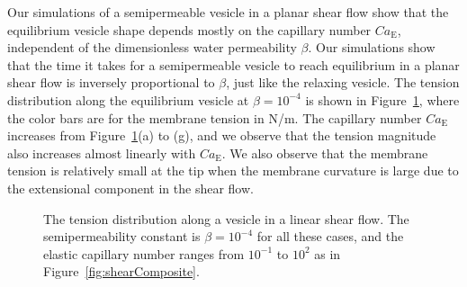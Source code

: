 \documentclass[prb,preprint,showpacs,preprintnumbers,amsmath,amssymb,longbibliography]{revtex4-1}
\begin{document}
Our simulations of a semipermeable vesicle in a planar shear flow show
that the equilibrium vesicle shape depends mostly on the capillary
number $Ca_\mathrm{E}$, independent of the dimensionless water
permeability $\beta$. Our simulations show that the time it takes for a
semipermeable vesicle to reach equilibrium in a planar shear flow is
inversely proportional to $\beta$, just like the relaxing vesicle. The
tension distribution along the equilibrium vesicle at $\beta=10^{-4}$ is
shown in Figure~\ref{fig:shearTensions}, where the color bars are for
the membrane tension in N/m. The capillary number $Ca_\mathrm{E}$
increases from Figure~\ref{fig:shearTensions}(a) to (g), and we observe
that the tension magnitude also increases almost linearly with
$Ca_\mathrm{E}$. We also observe that the membrane tension is relatively
small at the tip when the membrane curvature is large due to the
extensional component in the shear flow.
\begin{figure}[hbp]
  \caption{\label{fig:shearTensions} The tension distribution along a
  vesicle in a linear shear flow. The semipermeability constant is
  $\beta = 10^{-4}$ for all these cases, and the elastic capillary
  number ranges from $10^{-1}$ to $10^{2}$ as in
  Figure~\ref{fig:shearComposite}.}
\end{figure}

\end{document}
